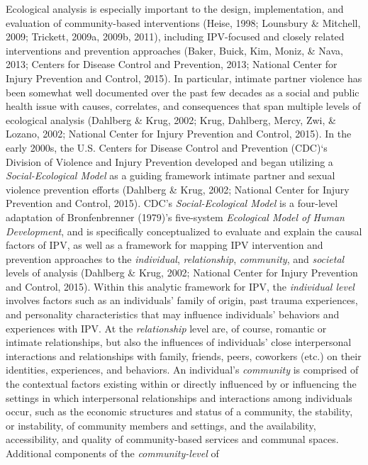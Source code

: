 \documentclass[11pt,]{tufte-book}
\begin{document}
Ecological analysis is especially important to the design,
implementation, and evaluation of community-based interventions (Heise,
1998; Lounsbury \& Mitchell, 2009; Trickett, 2009a, 2009b, 2011),
including IPV-focused and closely related interventions and prevention
approaches (Baker, Buick, Kim, Moniz, \& Nava, 2013; Centers for Disease
Control and Prevention, 2013; National Center for Injury Prevention and
Control, 2015). In particular, intimate partner violence has been
somewhat well documented over the past few decades as a social and
public health issue with causes, correlates, and consequences that span
multiple levels of ecological analysis (Dahlberg \& Krug, 2002; Krug,
Dahlberg, Mercy, Zwi, \& Lozano, 2002; National Center for Injury
Prevention and Control, 2015). In the early 2000s, the U.S. Centers for
Disease Control and Prevention (CDC)`s Division of Violence and Injury
Prevention developed and began utilizing a \emph{Social-Ecological
Model} as a guiding framework intimate partner and sexual violence
prevention efforts (Dahlberg \& Krug, 2002; National Center for Injury
Prevention and Control, 2015). CDC's \emph{Social-Ecological Model} is a
four-level adaptation of Bronfenbrenner (1979)'s five-system
\emph{Ecological Model of Human Development}, and is specifically
conceptualized to evaluate and explain the causal factors of IPV, as
well as a framework for mapping IPV intervention and prevention
approaches to the \emph{individual}, \emph{relationship},
\emph{community}, and \emph{societal} levels of analysis (Dahlberg \&
Krug, 2002; National Center for Injury Prevention and Control, 2015).
Within this analytic framework for IPV, the \emph{individual level}
involves factors such as an individuals' family of origin, past trauma
experiences, and personality characteristics that may influence
individuals' behaviors and experiences with IPV. At the
\emph{relationship} level are, of course, romantic or intimate
relationships, but also the influences of individuals' close
interpersonal interactions and relationships with family, friends,
peers, coworkers (etc.) on their identities, experiences, and behaviors.
An individual's \emph{community} is comprised of the contextual factors
existing within or directly influenced by or influencing the settings in
which interpersonal relationships and interactions among individuals
occur, such as the economic structures and status of a community, the
stability, or instability, of community members and settings, and the
availability, accessibility, and quality of community-based services and
communal spaces. Additional components of the \emph{community-level} of
\end{document}
